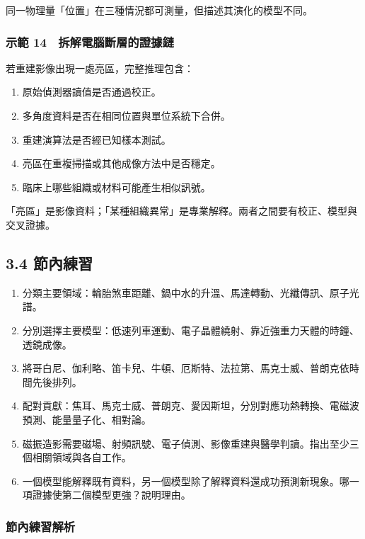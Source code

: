 \documentclass[11pt,a4paper]{article}
\providecommand{\tightlist}{%
  \setlength{\itemsep}{0pt}\setlength{\parskip}{0pt}}
\begin{document}
同一物理量「位置」在三種情況都可測量，但描述其演化的模型不同。

\subsubsection{示範 14　拆解電腦斷層的證據鏈}\label{ux793aux7bc4-14-ux62c6ux89e3ux96fbux8166ux65b7ux5c64ux7684ux8b49ux64daux93c8}

若重建影像出現一處亮區，完整推理包含：

\begin{enumerate}
\def\labelenumi{\arabic{enumi}.}
\tightlist
\item
  原始偵測器讀值是否通過校正。
\item
  多角度資料是否在相同位置與單位系統下合併。
\item
  重建演算法是否經已知樣本測試。
\item
  亮區在重複掃描或其他成像方法中是否穩定。
\item
  臨床上哪些組織或材料可能產生相似訊號。
\end{enumerate}

「亮區」是影像資料；「某種組織異常」是專業解釋。兩者之間要有校正、模型與交叉證據。

\subsection{3.4 節內練習}\label{ux7bc0ux5167ux7df4ux7fd2-2}

\begin{enumerate}
\def\labelenumi{\arabic{enumi}.}
\tightlist
\item
  分類主要領域：輪胎煞車距離、鍋中水的升溫、馬達轉動、光纖傳訊、原子光譜。
\item
  分別選擇主要模型：低速列車運動、電子晶體繞射、靠近強重力天體的時鐘、透鏡成像。
\item
  將哥白尼、伽利略、笛卡兒、牛頓、厄斯特、法拉第、馬克士威、普朗克依時間先後排列。
\item
  配對貢獻：焦耳、馬克士威、普朗克、愛因斯坦，分別對應功熱轉換、電磁波預測、能量量子化、相對論。
\item
  磁振造影需要磁場、射頻訊號、電子偵測、影像重建與醫學判讀。指出至少三個相關領域與各自工作。
\item
  一個模型能解釋既有資料，另一個模型除了解釋資料還成功預測新現象。哪一項證據使第二個模型更強？說明理由。
\end{enumerate}

\subsubsection{節內練習解析}\label{ux7bc0ux5167ux7df4ux7fd2ux89e3ux6790-2}
\end{document}
